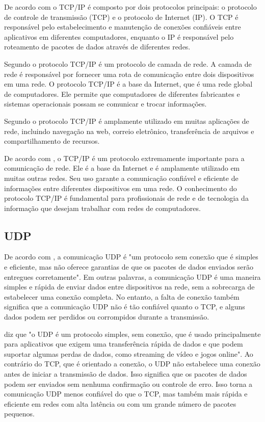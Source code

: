 \documentclass[12pt]{article}
\begin{document}
De acordo com \cite{tanenbaum2011redes} o TCP/IP é composto por dois protocolos principais: o protocolo de controle de transmissão (TCP) e o protocolo de Internet (IP). O TCP é responsável pelo estabelecimento e manutenção de conexões confiáveis entre aplicativos em diferentes computadores, enquanto o IP é responsável pelo roteamento de pacotes de dados através de diferentes redes.

Segundo \cite{forouzan2018comunicacao} o protocolo TCP/IP é um protocolo de camada de rede. A camada de rede é responsável por fornecer uma rota de comunicação entre dois dispositivos em uma rede. O protocolo TCP/IP é a base da Internet, que é uma rede global de computadores. Ele permite que computadores de diferentes fabricantes e sistemas operacionais possam se comunicar e trocar informações.

Segundo \cite{tanenbaum2011redes} o protocolo TCP/IP é amplamente utilizado em muitas aplicações de rede, incluindo navegação na web, correio eletrônico, transferência de arquivos e compartilhamento de recursos.

De acordo com \cite{forouzan2018comunicacao}, o TCP/IP é um protocolo extremamente importante para a comunicação de rede. Ele é a base da Internet e é amplamente utilizado em muitas outras redes. Seu uso garante a comunicação confiável e eficiente de informações entre diferentes dispositivos em uma rede. O conhecimento do protocolo TCP/IP é fundamental para profissionais de rede e de tecnologia da informação que desejam trabalhar com redes de computadores.

\subsection{UDP}
De acordo com \cite{kurose2013computer}, a comunicação UDP é "um protocolo sem conexão que é simples e eficiente, mas não oferece garantias de que os pacotes de dados enviados serão entregues corretamente". Em outras palavras, a comunicação UDP é uma maneira simples e rápida de enviar dados entre dispositivos na rede, sem a sobrecarga de estabelecer uma conexão completa. No entanto, a falta de conexão também significa que a comunicação UDP não é tão confiável quanto o TCP, e alguns dados podem ser perdidos ou corrompidos durante a transmissão.

\cite{forouzan2018comunicacao} diz que "o UDP é um protocolo simples, sem conexão, que é usado principalmente para aplicativos que exigem uma transferência rápida de dados e que podem suportar algumas perdas de dados, como streaming de vídeo e jogos online". Ao contrário do TCP, que é orientado a conexão, o UDP não estabelece uma conexão antes de iniciar a transmissão de dados. Isso significa que os pacotes de dados podem ser enviados sem nenhuma confirmação ou controle de erro. Isso torna a comunicação UDP menos confiável do que o TCP, mas também mais rápida e eficiente em redes com alta latência ou com um grande número de pacotes pequenos.
\end{document}
